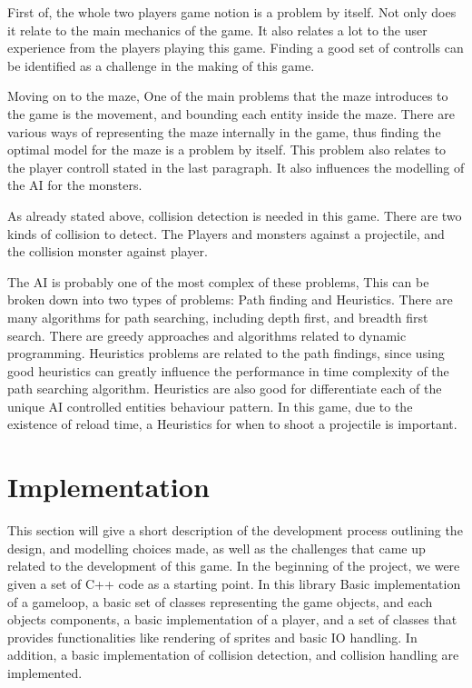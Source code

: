 \documentclass{article}
\begin{document}
  First of, the whole two players game notion is a problem by itself. Not only does it relate to the main mechanics of the game. It also relates a lot to the user experience from the players playing this game. Finding a good set of controlls can be identified as a challenge in the making of this game.

  Moving on to the maze, One of the main problems that the maze introduces to the game is the movement, and bounding each entity inside the maze. There are various ways of representing the maze internally in the game, thus finding the optimal model for the maze is a problem by itself. This problem also relates to the player controll stated in the last paragraph. It also influences the modelling of the AI for the monsters.

  As already stated above, collision detection is needed in this game. There are two kinds of collision to detect. The Players and monsters against a projectile, and the collision monster against player.

  The AI is probably one of the most complex of these problems, This can be broken down into two types of problems: Path finding and Heuristics. There are many algorithms for path searching, including depth first, and breadth first search. There are greedy approaches and algorithms related to dynamic programming. Heuristics problems are related to the path findings, since using good heuristics can greatly influence the performance in time complexity of the path searching algorithm. Heuristics are also good for differentiate each of the unique AI controlled entities behaviour pattern. In this game, due to the existence of reload time, a Heuristics for when to shoot a projectile is important.

  \section{Implementation}
  This section will give a short description of the development process outlining the design, and modelling choices made, as well as the challenges that came up related to the development of this game. In the beginning of the project, we were given a set of C++ code as a starting point. In this library Basic implementation of a gameloop, a basic set of classes representing the game objects, and each objects components, a basic implementation of a player, and a set of classes that provides functionalities like rendering of sprites and basic IO handling. In addition, a basic implementation of collision detection, and collision handling are implemented.
\end{document}
